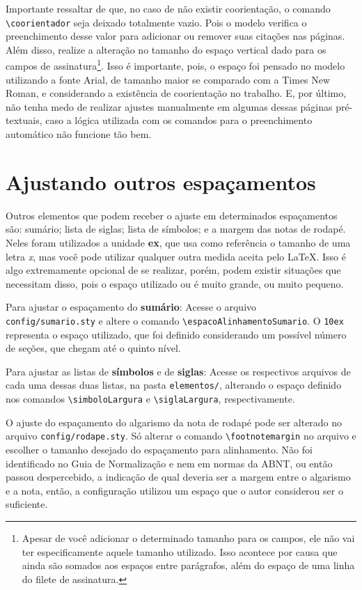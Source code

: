 Importante ressaltar de que, no caso de não existir coorientação, o comando \verb|\coorientador| seja deixado totalmente vazio. Pois o modelo verifica o preenchimento desse valor para adicionar ou remover suas citações nas páginas. Além disso, realize a alteração no tamanho do espaço vertical dado para os campos de assinatura\footnote{Apesar de você adicionar o determinado tamanho para os campos, ele não vai ter especificamente aquele tamanho utilizado. Isso acontece por causa que ainda são somados aos espaços entre parágrafos, além do espaço de uma linha do filete de assinatura.}. Isso é importante, pois, o espaço foi pensado no modelo utilizando a fonte Arial, de tamanho maior se comparado com a Times New Roman, e considerando a existência de coorientação no trabalho. E, por último, não tenha medo de realizar ajustes manualmente em algumas dessas páginas pré-textuais, caso a lógica utilizada com os comandos para o preenchimento automático não funcione tão bem.

\section{Ajustando outros espaçamentos}
Outros elementos que podem receber o ajuste em determinados espaçamentos são: sumário; lista de siglas; lista de símbolos; e a margem das notas de rodapé. Neles foram utilizados a unidade \textbf{ex}, que usa como referência o tamanho de uma letra \textit{x}, mas você pode utilizar qualquer outra medida aceita pelo \LaTeX{}. Isso é algo extremamente opcional de se realizar, porém, podem existir situações que necessitam disso, pois o espaço utilizado ou é muito grande, ou muito pequeno.

Para ajustar o espaçamento do \textbf{sumário}: Acesse o arquivo \\\texttt{config/sumario.sty} e altere o comando \verb|\espacoAlinhamentoSumario|. O \texttt{10ex} representa o espaço utilizado, que foi definido considerando um possível número de seções, que chegam até o quinto nível.

Para ajustar as listas de \textbf{símbolos} e de \textbf{siglas}: Acesse os respectivos arquivos de cada uma dessas duas listas, na pasta \texttt{elementos/}, alterando o espaço definido nos comandos \verb|\simboloLargura| e \verb|\siglaLargura|, respectivamente.

O ajuste do espaçamento do algarismo da nota de rodapé pode ser alterado no arquivo \texttt{config/rodape.sty}. Só alterar o comando \verb|\footnotemargin| no arquivo e escolher o tamanho desejado do espaçamento para alinhamento. Não foi identificado no Guia de Normalização e nem em normas da ABNT, ou então passou despercebido, a indicação de qual deveria ser a margem entre o algarismo e a nota, então, a configuração utilizou um espaço que o autor considerou ser o suficiente.

